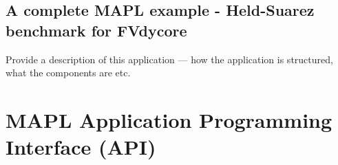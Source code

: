 \section{A complete MAPL example - Held-Suarez benchmark for FVdycore}
\label{sec:maplExample}
Provide a description of this application --- how the application is
structured, what the components are etc.
%


\appendix
\chapter{MAPL Application Programming Interface (API)}
\minitoc
\clearpage


% 

% 

% 

% 
% 

